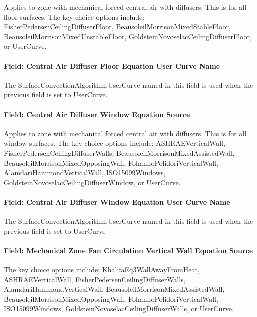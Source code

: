 Applies to zone with mechanical forced central air with diffusers. This is for all floor surfaces. The key choice options include: FisherPedersenCeilingDiffuserFloor, BeausoleilMorrisonMixedStableFloor, BeausoleilMorrisonMixedUnstableFloor, GoldsteinNovoselacCeilingDiffuserFloor, or UserCurve.

\paragraph{Field: Central Air Diffuser Floor Equation User Curve Name}\label{field-central-air-diffuser-floor-equation-user-curve-name}

The SurfaceConvectionAlgorithm:UserCurve named in this field is used when the previous field is set to UserCurve.

\paragraph{Field: Central Air Diffuser Window Equation Source}\label{field-central-air-diffuser-window-equation-source}

Applies to zone with mechanical forced central air with diffusers. This is for all window surfaces. The key choice options include: ASHRAEVerticalWall, FisherPedersenCeilingDiffuserWalls, BeausoleilMorrisonMixedAssistedWall, BeausoleilMorrisonMixedOpposingWall, FohannoPolidoriVerticalWall, AlamdariHammondVerticalWall, ISO15099Windows, GoldsteinNovoselacCeilingDiffuserWindow, or UserCurve.

\paragraph{Field: Central Air Diffuser Window Equation User Curve Name}\label{field-central-air-diffuser-window-equation-user-curve-name}

The SurfaceConvectionAlgorithm:UserCurve named in this field is used when the previous field is set to UserCurve

\paragraph{Field: Mechanical Zone Fan Circulation Vertical Wall Equation Source}\label{field-mechanical-zone-fan-circulation-vertical-wall-equation-source}

The key choice options include: KhalifaEq3WallAwayFromHeat, ASHRAEVerticalWall, FisherPedersenCeilingDiffuserWalls, AlamdariHammondVerticalWall, BeausoleilMorrisonMixedAssistedWall, BeausoleilMorrisonMixedOpposingWall, FohannoPolidoriVerticalWall, ISO15099Windows, GoldsteinNovoselacCeilingDiffuserWalls, or UserCurve.

